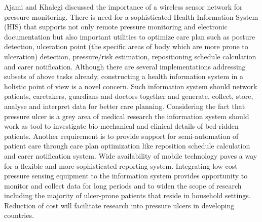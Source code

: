 Ajami and Khalegi discussed the importance of a wireless sensor network for pressure monitoring. There is need for a sophisticated Health Information System (HIS) that supports not only remote pressure monitoring and electronic documentation but also important utilities to optimize care plan such as posture detection, ulceration point (the specific areas of body which are more prone to ulceration) detection, pressure/risk estimation, repositioning schedule calculation and carer notification. Although there are several implementations addressing subsets of above tasks already, constructing a health information system in a holistic point of view is a novel concern. Such information system should network patients, caretakers, guardians and doctors together and generate, collect, store, analyse and interpret data for better care planning. Considering the fact that pressure ulcer is a grey area of medical research the information system should work as tool to investigate bio-mechanical and clinical details of bed-ridden patients. Another requirement is to provide support for semi-automation of patient care through care plan optimization like reposition schedule calculation and carer notification system. Wide availability of mobile technology paves a way for a flexible and more sophisticated reporting system. Integrating low cost pressure sensing equipment to the information system provides opportunity to monitor and collect data for long periods and to widen the scope of research including the majority of ulcer-prone patients that reside in household settings. Reduction of cost will facilitate research into pressure ulcers in developing countries.
